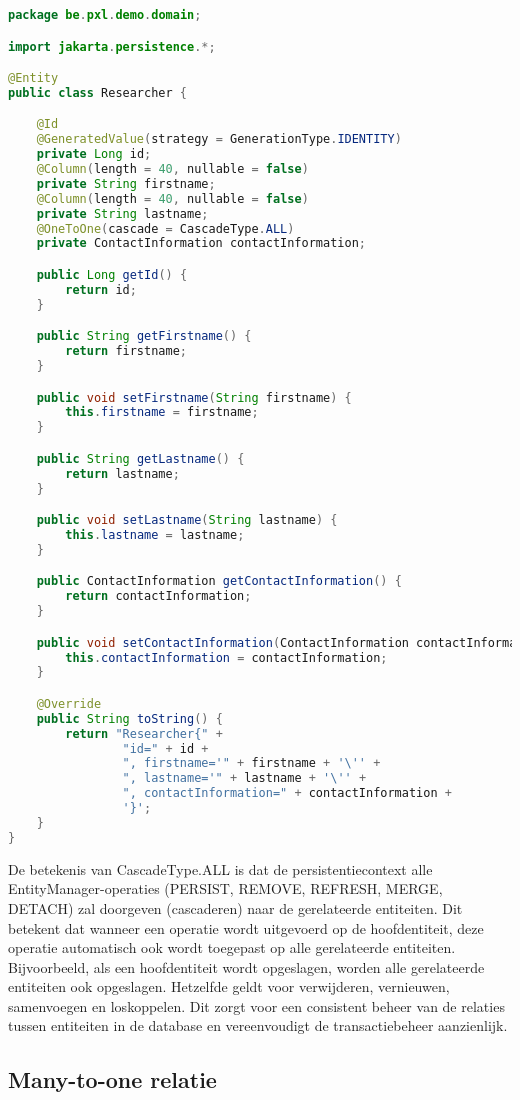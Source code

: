 \begin{lstlisting}[frame=single, language=java]
package be.pxl.demo.domain;

import jakarta.persistence.*;

@Entity
public class Researcher {

	@Id
	@GeneratedValue(strategy = GenerationType.IDENTITY)
	private Long id;
	@Column(length = 40, nullable = false)
	private String firstname;
	@Column(length = 40, nullable = false)
	private String lastname;
	@OneToOne(cascade = CascadeType.ALL)
	private ContactInformation contactInformation;

	public Long getId() {
		return id;
	}

	public String getFirstname() {
		return firstname;
	}

	public void setFirstname(String firstname) {
		this.firstname = firstname;
	}

	public String getLastname() {
		return lastname;
	}

	public void setLastname(String lastname) {
		this.lastname = lastname;
	}

	public ContactInformation getContactInformation() {
		return contactInformation;
	}

	public void setContactInformation(ContactInformation contactInformation) {
		this.contactInformation = contactInformation;
	}

	@Override
	public String toString() {
		return "Researcher{" +
				"id=" + id +
				", firstname='" + firstname + '\'' +
				", lastname='" + lastname + '\'' +
				", contactInformation=" + contactInformation +
				'}';
	}
}

\end{lstlisting}

De betekenis van CascadeType.ALL is dat de persistentiecontext alle EntityManager-operaties (PERSIST, REMOVE, REFRESH, MERGE, DETACH) zal doorgeven (cascaderen) naar de gerelateerde entiteiten. Dit betekent dat wanneer een operatie wordt uitgevoerd op de hoofdentiteit, deze operatie automatisch ook wordt toegepast op alle gerelateerde entiteiten. Bijvoorbeeld, als een hoofdentiteit wordt opgeslagen, worden alle gerelateerde entiteiten ook opgeslagen. Hetzelfde geldt voor verwijderen, vernieuwen, samenvoegen en loskoppelen. Dit zorgt voor een consistent beheer van de relaties tussen entiteiten in de database en vereenvoudigt de transactiebeheer aanzienlijk.

\subsection{Many-to-one relatie}

